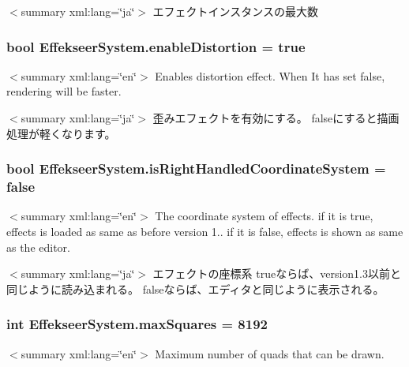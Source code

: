 $<$summary xml\-:lang=\char`\"{}ja\char`\"{}$>$ エフェクトインスタンスの最大数 \hypertarget{class_effekseer_system_ad8a639d37912d6a3ada4ba5a065a7493}{
\subsubsection[{enable\-Distortion}]{\setlength{\rightskip}{0pt plus 5cm}bool Effekseer\-System.\-enable\-Distortion = true}}\label{class_effekseer_system_ad8a639d37912d6a3ada4ba5a065a7493}
$<$summary xml\-:lang=\char`\"{}en\char`\"{}$>$ Enables distortion effect. When It has set false, rendering will be faster. 

$<$summary xml\-:lang=\char`\"{}ja\char`\"{}$>$ 歪みエフェクトを有効にする。 falseにすると描画処理が軽くなります。 \hypertarget{class_effekseer_system_a106a9e679535bdacd968ab94c421321e}{
\subsubsection[{is\-Right\-Handled\-Coordinate\-System}]{\setlength{\rightskip}{0pt plus 5cm}bool Effekseer\-System.\-is\-Right\-Handled\-Coordinate\-System = false}}\label{class_effekseer_system_a106a9e679535bdacd968ab94c421321e}
$<$summary xml\-:lang=\char`\"{}en\char`\"{}$>$ The coordinate system of effects. if it is true, effects is loaded as same as before version 1.. if it is false, effects is shown as same as the editor. 

$<$summary xml\-:lang=\char`\"{}ja\char`\"{}$>$ エフェクトの座標系 trueならば、version1.3以前と同じように読み込まれる。 falseならば、エディタと同じように表示される。 \hypertarget{class_effekseer_system_a2007e297eab6bc504cce40650679b1c4}{
\subsubsection[{max\-Squares}]{\setlength{\rightskip}{0pt plus 5cm}int Effekseer\-System.\-max\-Squares = 8192}}\label{class_effekseer_system_a2007e297eab6bc504cce40650679b1c4}
$<$summary xml\-:lang=\char`\"{}en\char`\"{}$>$ Maximum number of quads that can be drawn. 

